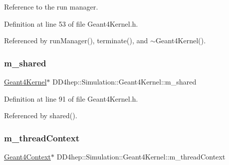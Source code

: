 Reference to the run manager. 



Definition at line 53 of file Geant4\+Kernel.\+h.



Referenced by run\+Manager(), terminate(), and $\sim$\+Geant4\+Kernel().

\hypertarget{class_d_d4hep_1_1_simulation_1_1_geant4_kernel_a47da20469676a2497cbf580428984362}{}\label{class_d_d4hep_1_1_simulation_1_1_geant4_kernel_a47da20469676a2497cbf580428984362} 
\subsubsection{\texorpdfstring{m\+\_\+shared}{m\_shared}}
{\footnotesize\ttfamily \hyperlink{class_d_d4hep_1_1_simulation_1_1_geant4_kernel}{Geant4\+Kernel}$\ast$ D\+D4hep\+::\+Simulation\+::\+Geant4\+Kernel\+::m\+\_\+shared\hspace{0.3cm}{\ttfamily [protected]}}



Definition at line 91 of file Geant4\+Kernel.\+h.



Referenced by shared().

\hypertarget{class_d_d4hep_1_1_simulation_1_1_geant4_kernel_a774c57eb5d21094d0ecca5db90f24998}{}\label{class_d_d4hep_1_1_simulation_1_1_geant4_kernel_a774c57eb5d21094d0ecca5db90f24998} 
\subsubsection{\texorpdfstring{m\+\_\+thread\+Context}{m\_threadContext}}
{\footnotesize\ttfamily \hyperlink{class_d_d4hep_1_1_simulation_1_1_geant4_context}{Geant4\+Context}$\ast$ D\+D4hep\+::\+Simulation\+::\+Geant4\+Kernel\+::m\+\_\+thread\+Context\hspace{0.3cm}{\ttfamily [protected]}}



